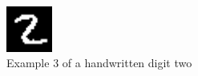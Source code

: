 \documentclass[conference]{IEEEtran}
\begin{document}
 \begin{figure}[htbp]
\centerline{\includegraphics[width=15mm]{./digit-images/2-4.png}}
\caption{Example 3 of a handwritten digit two}
\label{example3}
\end{figure}

\end{document}
